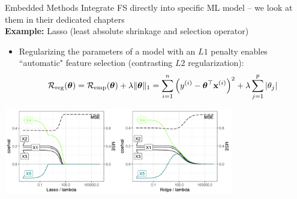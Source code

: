 \documentclass[11pt,compress,t,notes=noshow, xcolor=table]{beamer}
\begin{document}
  \begin{vbframe}{Embedded Methods}
  Integrate FS directly into specific ML model -- we look at them in their dedicated chapters\\
    \vspace{0.25cm}
    \textbf{Example:} Lasso (least absolute shrinkage and selection operator)
    \begin{itemize}
      \item Regularizing the parameters of a model with an $L1$ penalty %
      enables ``automatic" feature selection (contrasting $L2$ regularization):
      \vspace{-0.28cm}
      $$ \mathcal{R}_{\text{reg}}(\bm{\theta}) = \mathcal{R}_{\text{emp}}(\bm{\theta}) + \lambda \|\bm{\theta}\|_1 = \sum\limits_{i=1}^n \left(y^{(i)} - \bm{\theta}^\top \mathbf{x}^{(i)} \right)^2 +\lambda \sum_{j=1}^p |\theta_j| $$
    \end{itemize}

  \begin{center}
  \includegraphics[width=0.75\textwidth]{figure/regu_example_lasso_ridge.png}
  \end{center}
    
  \end{vbframe}

  \endlecture
\end{document}
